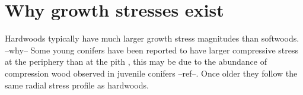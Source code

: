 \section{Why growth stresses exist}
Hardwoods typically have much larger growth stress magnitudes than softwoods.
--why-- \cite{barnett1981xylem} Some young conifers have been
reported to have larger compressive stress at the periphery than at the pith \cite{jacobs1945l}, this may be due to the abundance of compression wood observed in juvenile conifers --ref--. Once older they follow the same radial stress profile
as hardwoods.